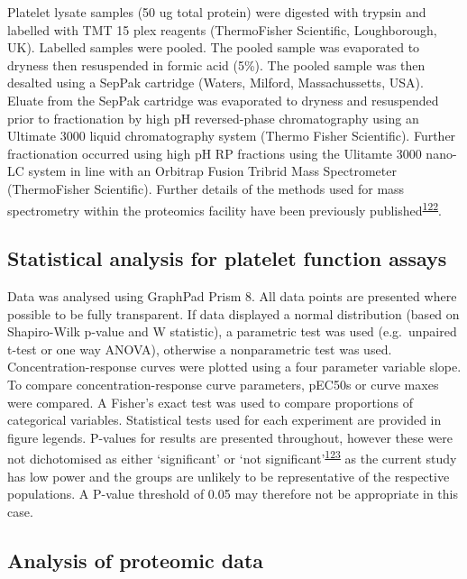 \documentclass[11pt,twoside]{bristolthesis}
\begin{document}
Platelet lysate samples (50 ug total protein) were digested with trypsin and labelled with TMT 15 plex reagents (ThermoFisher Scientific, Loughborough, UK). Labelled samples were pooled. The pooled sample was evaporated to dryness then resuspended in formic acid (5\%). The pooled sample was then desalted using a SepPak cartridge (Waters, Milford, Massachussetts, USA). Eluate from the SepPak cartridge was evaporated to dryness and resuspended prior to fractionation by high pH reversed-phase chromatography using an Ultimate 3000 liquid chromatography system (Thermo Fisher Scientific). Further fractionation occurred using high pH RP fractions using the Ulitamte 3000 nano-LC system in line with an Orbitrap Fusion Tribrid Mass Spectrometer (ThermoFisher Scientific). Further details of the methods used for mass spectrometry within the proteomics facility have been previously published\textsuperscript{\protect\hyperlink{ref-Durrant2020}{122}}.

\hypertarget{statistical-analysis-for-platelet-function-assays}{%
\subsection{Statistical analysis for platelet function assays}\label{statistical-analysis-for-platelet-function-assays}}

Data was analysed using GraphPad Prism 8. All data points are presented where possible to be fully transparent. If data displayed a normal distribution (based on Shapiro-Wilk p-value and W statistic), a parametric test was used (e.g.~unpaired t-test or one way ANOVA), otherwise a nonparametric test was used. Concentration-response curves were plotted using a four parameter variable slope. To compare concentration-response curve parameters, pEC50s or curve maxes were compared. A Fisher's exact test was used to compare proportions of categorical variables. Statistical tests used for each experiment are provided in figure legends. P-values for results are presented throughout, however these were not dichotomised as either `significant' or `not significant'\textsuperscript{\protect\hyperlink{ref-Sterne2001}{123}} as the current study has low power and the groups are unlikely to be representative of the respective populations. A P-value threshold of 0.05 may therefore not be appropriate in this case.

\hypertarget{analysis-of-proteomic-data}{%
\subsection{Analysis of proteomic data}\label{analysis-of-proteomic-data}}
\end{document}
